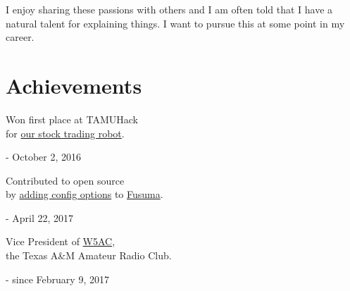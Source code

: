 \documentclass{article}
\newcommand{\jskill}[2]{
\noindent
\begin{minipage}[t]{.15\textwidth}
\raggedleft{#1}
\end{minipage}
\hspace{.05em}\vline\hspace{.05em}
\begin{minipage}[t]{.80\textwidth}
#2
\end{minipage}

\vspace{0.75em}}
\begin{document}
\jskill{Teaching}{I enjoy sharing these passions with others and I am often told
 that I have a natural talent for explaining things. I want to pursue this at
some point in my career.}

\section{Achievements}

\noindent
\begin{minipage}[t]{0.33\textwidth}
 Won first place at TAMUHack \\
 for \href{https://devpost.com/software/midas-evi574}{our stock trading robot}.

 \hfill - October 2, 2016 \end{minipage}\hfill
 \begin{minipage}[t]{0.33\textwidth} Contributed to open source \\ by
  \href{https://github.com/iberianpig/fusuma/pull/36}{adding config options} to
  \href{https://github.com/iberianpig/fusuma}{Fusuma}.

  \hfill - April 22, 2017
 \end{minipage}\hfill
 \begin{minipage}[t]{0.33\textwidth}
  Vice President of \href{http://w5ac.tamu.edu}{W5AC},  \\
  the Texas A\&M Amateur Radio Club.

  \hfill - since February 9, 2017
 \end{minipage}

\end{document}
